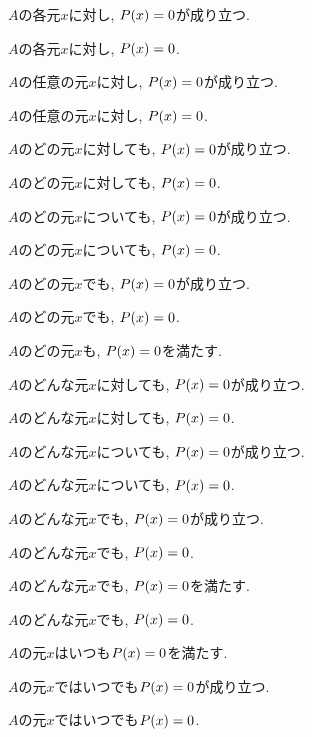 \item $A$の各元$x$に対し, $P(x)=0$が成り立つ.
\item $A$の各元$x$に対し, $P(x)=0$.
\item $A$の任意の元$x$に対し, $P(x)=0$が成り立つ.
\item $A$の任意の元$x$に対し, $P(x)=0$.
\item $A$のどの元$x$に対しても, $P(x)=0$が成り立つ.
\item $A$のどの元$x$に対しても, $P(x)=0$.
\item $A$のどの元$x$についても, $P(x)=0$が成り立つ.
\item $A$のどの元$x$についても, $P(x)=0$.
\item $A$のどの元$x$でも, $P(x)=0$が成り立つ.
\item $A$のどの元$x$でも, $P(x)=0$.
\item $A$のどの元$x$も, $P(x)=0$を満たす.
\item $A$のどんな元$x$に対しても, $P(x)=0$が成り立つ.
\item $A$のどんな元$x$に対しても, $P(x)=0$.
\item $A$のどんな元$x$についても, $P(x)=0$が成り立つ.
\item $A$のどんな元$x$についても, $P(x)=0$.
\item $A$のどんな元$x$でも, $P(x)=0$が成り立つ.
\item $A$のどんな元$x$でも, $P(x)=0$.
\item $A$のどんな元$x$でも, $P(x)=0$を満たす.
\item $A$のどんな元$x$でも, $P(x)=0$.
\item $A$の元$x$はいつも$P(x)=0$を満たす.
\item $A$の元$x$ではいつでも$P(x)=0$が成り立つ.
\item $A$の元$x$ではいつでも$P(x)=0$.
